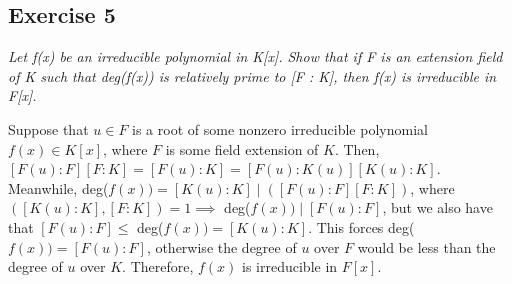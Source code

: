 \subsection*{Exercise 5}
\textit{Let f(x) be an irreducible polynomial in K[x]. Show that if F is an extension field of K such that deg(f(x)) is relatively prime to [F : K], then f(x) is irreducible in F[x].}

\vspace{5 mm}
Suppose that $u \in F$ is a root of some nonzero irreducible polynomial $f(x) \in K[x]$, where $F$ is some field extension of $K$. Then, $[F(u): F][F: K] = [F(u): K] = [F(u): K(u)][K(u): K]$. Meanwhile, deg($f(x)) = [K(u):K] \mid ([F(u): F][F: K])$, where $([K(u): K],[F: K]) = 1 \implies $ deg($f(x)) \mid [F(u):F]$, but we also have that $[F(u):F] \le$ deg($f(x)) = [K(u):K]$. This forces deg($f(x)) = [F(u): F]$, otherwise the degree of $u$ over $F$ would be less than the degree of $u$ over $K$. Therefore, $f(x)$ is irreducible in $F[x]$.
